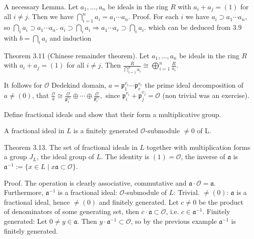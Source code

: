 A necessary Lemma.
Let \( a_1, \ldots, a_n \) be ideals in the ring \( R \) with \( a_i + a_j = (1) \) for all \( i \neq j \). Then we have
\(
\bigcap_{i=1}^n a_i = a_1 \cdots a_n.
\)
Proof. 
For each \( i \) we have \( a_i \supset a_1 \cdots a_n \), so \( \bigcap_i a_i \supset a_1 \cdots a_n \).
\( a_i \supset \bigcap_i a_i \Longrightarrow a_1 \cdots a_r \supset \bigcap_i a_i \).
which can be deduced from 3.9 with \(b = \bigcap_i a_i\) and induction

Theorem 3.11 (Chinese remainder theorem). 
Let \( a_1, \ldots, a_n \) be ideals in the ring \( R \) with \( a_i + a_j = (1) \) for all \( i \neq j \). Then
\(
\frac{R}{\bigcap_{i=1}^n a_i} \cong \bigoplus_{i=1}^n \frac{R}{a_i}.
\)

It follows for \(\mathcal{O}\) Dedekind domain, 
\(a = \mathfrak{p}_1^{v_1} \cdots \mathfrak{p}_r^{v_r}\) the prime ideal decomposition of \(a \neq (0)\), that
\(
\frac{\mathcal{O}}{a} \cong \frac{\mathcal{O}}{\mathfrak{p}_1^{v_1}} \oplus \cdots \oplus \frac{\mathcal{O}}{\mathfrak{p}_r^{v_r}},
\)
since \(\mathfrak{p}_i^{v_i} + \mathfrak{p}_j^{v_j} = \mathcal{O}\) (non trivial was an exercise).


Define fractional ideals and show that their form a multiplicative group.

A fractional ideal in \( L \) is a finitely generated \( \mathcal{O} \)-submodule \( \neq 0 \)
of L.

Theorem 3.13. 
The set of fractional ideals in \( L \) together with multiplication forms a group \( J_L \), the ideal group of \( L \). 
The identity is \( (1) = \mathcal{O} \), the inverse of \( \mathfrak{a} \) is 
\(\mathfrak{a}^{-1} := \{ x \in L \mid x \mathfrak{a} \subset \mathcal{O} \} \).

Proof. The operation is clearly associative, commutative and \(\mathfrak{a} \cdot \mathcal{O} = \mathfrak{a}\). 
Furthermore, \(\mathfrak{a}^{-1}\) is a fractional ideal:
\(\mathcal{O}\)-submodule of \( L \): Trivial.
\(\neq (0)\): \(\mathfrak{a}\) is a fractional ideal, hence \(\neq (0)\) and finitely generated. Let \( c \neq 0 \) be the product of denominators 
of some generating set, then \( c \cdot \mathfrak{a} \subset \mathcal{O} \), i.e. \( c \in \mathfrak{a}^{-1} \).
Finitely generated: Let \( 0 \neq y \in \mathfrak{a} \). Then \( y \cdot \mathfrak{a}^{-1} \subset \mathcal{O} \), so by the previous example 
\(\mathfrak{a}^{-1}\) is finitely generated.

